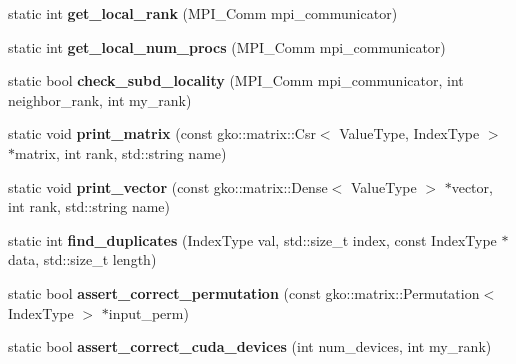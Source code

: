 \begin{DoxyCompactItemize}
\item 
\mbox{\label{structschwz_1_1Utils_a6f65fc83d6270453712a2600bab557ce}} 
static int {\bfseries get\+\_\+local\+\_\+rank} (M\+P\+I\+\_\+\+Comm mpi\+\_\+communicator)
\item 
\mbox{\label{structschwz_1_1Utils_a33d613297cb2b53634c1ed2b44fe595c}} 
static int {\bfseries get\+\_\+local\+\_\+num\+\_\+procs} (M\+P\+I\+\_\+\+Comm mpi\+\_\+communicator)
\item 
\mbox{\label{structschwz_1_1Utils_a18df4f61989071e018f64ac7d7a1d6f1}} 
static bool {\bfseries check\+\_\+subd\+\_\+locality} (M\+P\+I\+\_\+\+Comm mpi\+\_\+communicator, int neighbor\+\_\+rank, int my\+\_\+rank)
\item 
\mbox{\label{structschwz_1_1Utils_a6f0494e5c7d6be0585e26efd1d1fa64c}} 
static void {\bfseries print\+\_\+matrix} (const gko\+::matrix\+::\+Csr$<$ Value\+Type, Index\+Type $>$ $\ast$matrix, int rank, std\+::string name)
\item 
\mbox{\label{structschwz_1_1Utils_a1abe3d1bde2091a0361f8beadb925f70}} 
static void {\bfseries print\+\_\+vector} (const gko\+::matrix\+::\+Dense$<$ Value\+Type $>$ $\ast$vector, int rank, std\+::string name)
\item 
\mbox{\label{structschwz_1_1Utils_a391ddf4f24fb8d7c7ffacf8f046f94b5}} 
static int {\bfseries find\+\_\+duplicates} (Index\+Type val, std\+::size\+\_\+t index, const Index\+Type $\ast$data, std\+::size\+\_\+t length)
\item 
\mbox{\label{structschwz_1_1Utils_a324726628a2cc9e0021069f5a060a140}} 
static bool {\bfseries assert\+\_\+correct\+\_\+permutation} (const gko\+::matrix\+::\+Permutation$<$ Index\+Type $>$ $\ast$input\+\_\+perm)
\item 
\mbox{\label{structschwz_1_1Utils_a6a86d7ed4bb4e8256378d0f5c31a20df}} 
static bool {\bfseries assert\+\_\+correct\+\_\+cuda\+\_\+devices} (int num\+\_\+devices, int my\+\_\+rank)
\end{DoxyCompactItemize}


